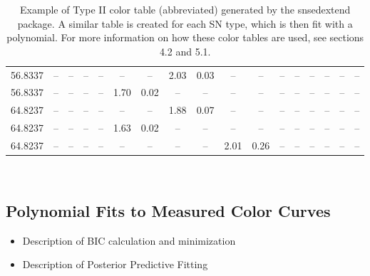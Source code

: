 \begin{table}[H]
{\begin{tabular}{@{}RCCCCCCCCCCCCCCCC@{}}
56.8337 & -- & -- & -- & -- & -- & -- & 2.03 & 0.03 & -- & -- & -- & -- & -- & -- & -- & -- \\
56.8337 & -- & -- & -- & -- & 1.70 & 0.02 & -- & -- & -- & -- & -- & -- & -- & -- & -- & -- \\
64.8237 & -- & -- & -- & -- & -- & -- & 1.88 & 0.07 & -- & -- & -- & -- & -- & -- & -- & -- \\
64.8237 & -- & -- & -- & -- & 1.63 & 0.02 & -- & -- & -- & -- & -- & -- & -- & -- & -- & -- \\
64.8237 & -- & -- & -- & -- & -- & -- & -- & -- & 2.01 & 0.26 & -- & -- & -- & -- & -- & -- \\ 
\end{tabular}%
}
\caption{Example of Type II color table (abbreviated) generated by the snsedextend package. A similar table is created for each SN type, which is then fit with a polynomial. For more information on how these color tables are used, see sections 4.2 and 5.1.}
\label{my-label}
\end{table}

\

\subsection{Polynomial Fits to Measured Color Curves}
\begin{itemize}
\item Description of BIC calculation and minimization
\item Description of Posterior Predictive Fitting 
\end{itemize}

\

